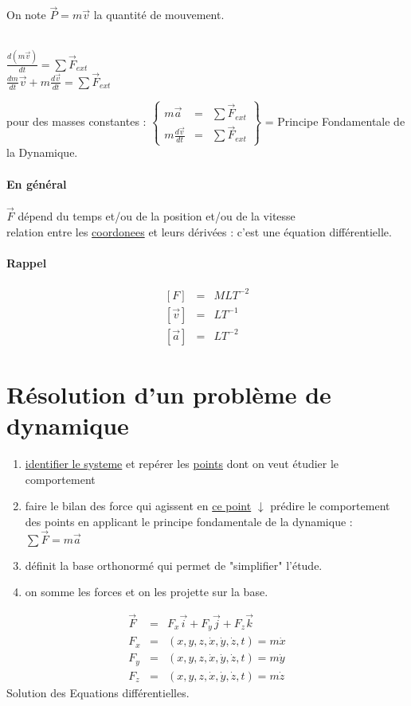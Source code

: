On note $\vec{P}=m\vec{v}$ la quantité de mouvement.

 ~\\
$\frac{d(m\vec{v})}{dt}=\sum\vec{F}_{ext}$ ~\\
$\frac{dm}{dt}\vec{v}+m\frac{d\vec{v}}{dt}=\sum\vec{F}_{ext}$

pour des masses constantes : $\left\{ \begin{array}{rcl}
		m\vec{a} &=& \sum\vec{F}_{ext} \\
		m\frac{d\vec{v}}{dt}&=&\sum\vec{F}_{ext}
	\end{array}\right\} $ = Principe Fondamentale de la Dynamique.

	\paragraph{En général} $\vec{F}$ dépend du temps et/ou de la position et/ou de la vitesse ~\\
	 relation entre les \ul{coordonees} et leurs dérivées : c'est une équation différentielle.

	\paragraph{Rappel} \[\begin{array}{rcl}
			{[F]} &=& MLT^{-2} \\
			{[\overrightarrow{v}]} &=& LT^{-1} \\
			{[\overrightarrow{a}]} &=& LT^{-2}
	\end{array}\]

	\section{Résolution d'un problème de dynamique}

	\begin{enumerate}
		\item \ul{identifier le systeme} et repérer les \ul{points} dont on veut étudier le comportement
		\item faire le bilan des force qui agissent en \ul{ce point} $\downarrow$ prédire le comportement des points en applicant le principe fondamentale de la dynamique : $\sum\vec{F}=m\vec{a}$
		\item définit la base orthonormé qui permet de "simplifier" l'étude.
		\item on somme les forces et on les projette sur la base.
	\end{enumerate}

	\[\begin{array}{rcl}
			\vec{F}&=&F_x\vec{i}+F_y\vec{j}+F_z\vec{k} \\
			F_x&=&(x, y, z, \dot{x}, \dot{y}, \dot{z}, t) = m\dot{x} \\
			F_y&=&(x, y, z, \dot{x}, \dot{y}, \dot{z}, t) = m\dot{y} \\
			F_z&=&(x, y, z, \dot{x}, \dot{y}, \dot{z}, t) = m\dot{z}
	\end{array}\]
	Solution des Equations différentielles.
